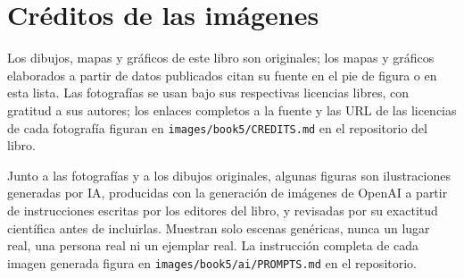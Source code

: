 \chapter*{Créditos de las imágenes}

Los dibujos, mapas y gráficos de este libro son originales; los mapas y gráficos
elaborados a partir de datos publicados citan su fuente en el pie de figura o en
esta lista. Las fotografías se usan bajo sus respectivas licencias libres, con
gratitud a sus autores; los enlaces completos a la fuente y las URL de las
licencias de cada fotografía figuran en \texttt{images/book5/CREDITS.md} en el
repositorio del libro.

\bigskip
Junto a las fotografías y a los dibujos originales, algunas figuras son
ilustraciones generadas por IA, producidas con la generación de imágenes de OpenAI
a partir de instrucciones escritas por los editores del libro, y revisadas por su
exactitud científica antes de incluirlas. Muestran solo escenas genéricas, nunca un
lugar real, una persona real ni un ejemplar real. La instrucción completa de cada
imagen generada figura en \texttt{images/book5/ai/PROMPTS.md} en el repositorio.

